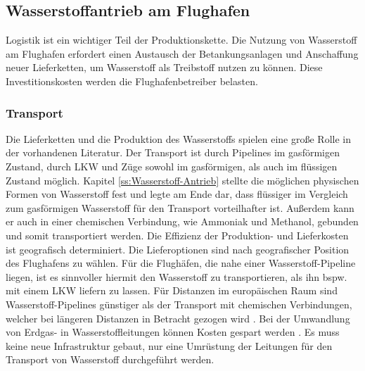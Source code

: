 
\subsection{Wasserstoffantrieb am Flughafen}
Logistik ist ein wichtiger Teil der Produktionskette. 
Die Nutzung von Wasserstoff am Flughafen erfordert einen Austausch der 
Betankungsanlagen und Anschaffung neuer Lieferketten, 
um Wasserstoff als Treibstoff nutzen zu können. 
Diese Investitionskosten werden die Flughafenbetreiber belasten.
\subsubsection{Transport}
Die Lieferketten und die Produktion des Wasserstoffs spielen 
eine große Rolle in der vorhandenen Literatur.
Der Transport ist durch Pipelines im gasförmigen Zustand, 
durch LKW und Züge sowohl im gasförmigen, als auch im flüssigen Zustand möglich. 
Kapitel \ref{ss:Wasserstoff-Antrieb} stellte die möglichen physischen Formen 
von Wasserstoff fest und legte am Ende dar, 
dass flüssiger im Vergleich zum gasförmigen 
Wasserstoff für den Transport vorteilhafter ist. 
Außerdem kann er auch in einer chemischen Verbindung, 
wie Ammoniak und Methanol, gebunden und somit transportiert werden.
%
%
%
% 
Die Effizienz der Produktion- und Lieferkosten ist geografisch determiniert. 
Die Lieferoptionen sind nach geografischer Position des Flughafens zu wählen. 
Für die Flughäfen, die nahe einer Wasserstoff-Pipeline liegen, ist es sinnvoller
hiermit den Wasserstoff zu transportieren, als ihn bspw. mit einem LKW liefern zu lassen.
%
Für Distanzen im europäischen Raum sind Wasserstoff-Pipelines
günstiger als der Transport mit chemischen Verbindungen, 
welcher bei längeren Distanzen in Betracht gezogen wird \cite{undertaking2022strategic}. 
Bei der Umwandlung von Erdgas- in Wasserstoffleitungen können Kosten gespart werden \cite{undertaking2022strategic}. 
Es muss keine neue Infrastruktur gebaut, nur eine Umrüstung der 
Leitungen für den Transport von Wasserstoff durchgeführt werden.

